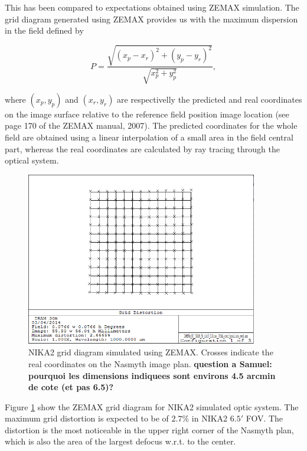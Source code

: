 This has been compared to expectations obtained using ZEMAX
simulation. The grid diagram generated using ZEMAX provides us with
the maximum dispersion in the field defined by

\begin{equation}
P = \frac{\sqrt{(x_p - x_r)^2 + (y_p - y_r)^2}}{\sqrt{x_p^2 + y_p^2}},
\end{equation}

where $(x_p, y_p)$ and $(x_r, y_r)$ are respectivelly the predicted
and real coordinates on the image surface relative to the reference
field position image location (see page 170 of the ZEMAX manual, 2007).
The predicted coordinates for the whole field are obtained using a
linear interpolation of a small area in the field central part,
whereas the real coordinates are calculated by ray tracing through the
optical system.

\begin{figure}[ht] 
\begin{center}
\includegraphics[width=0.9\textwidth]{Figures/NIKA2_Final_grid.png}
\caption{NIKA2 grid diagram simulated using ZEMAX. Crosses indicate
  the real coordinates on the Nasmyth image plan. {\bf question a
    Samuel: pourquoi les dimensions indiquees sont environs 4.5 arcmin
  de cote (et pas 6.5)?}}
 \label{fig:fov_grid_distortion_zemax}
\end{center}
\end{figure}

Figure \ref{fig:fov_grid_distortion_zemax} show the ZEMAX grid diagram for
NIKA2 simulated optic system. The maximum grid distortion is expected
to be of $2.7\%$ in NIKA2 $6.5'$ FOV. The distortion is the most
noticeable in the upper right corner of the Nasmyth plan, which is
also the area of the largest defocus w.r.t. to the center. 

